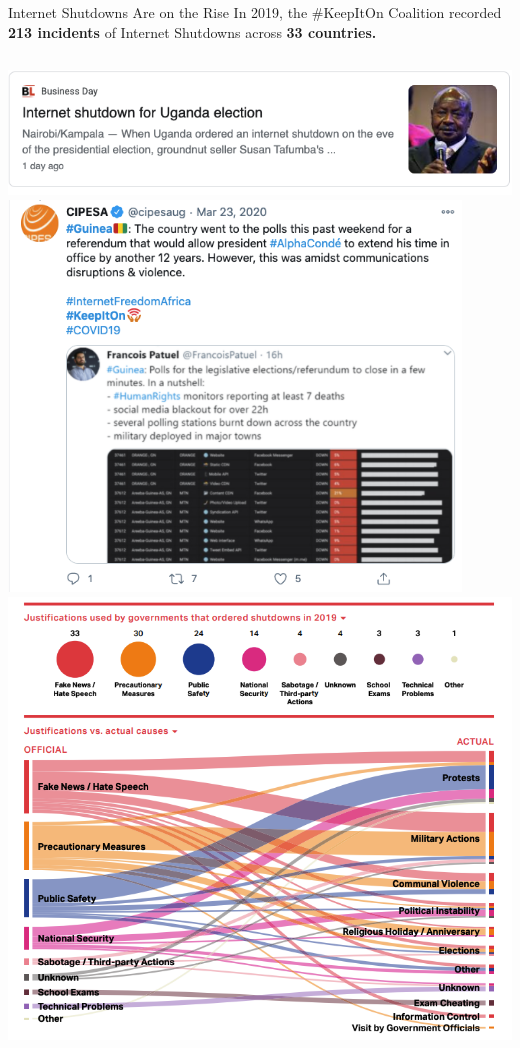 \documentclass[nobackground,dvipsnames,table,aspectratio=169]{beamer}
\begin{document}
\begin{frame}{Internet Shutdowns Are on the Rise}
    \small{In 2019, the \#KeepItOn Coalition recorded \textbf{213 incidents} of Internet Shutdowns across \textbf{33 countries.}}
    \begin{columns}
            \includegraphics[width=\textwidth]{unganda-internet-shutdown}
            \includegraphics[width=0.9\textwidth]{guinea-internet-disruptions}
            \includegraphics[width=\textwidth]{shutdown-justifications}
    \end{columns}
\end{frame}
\end{document}

